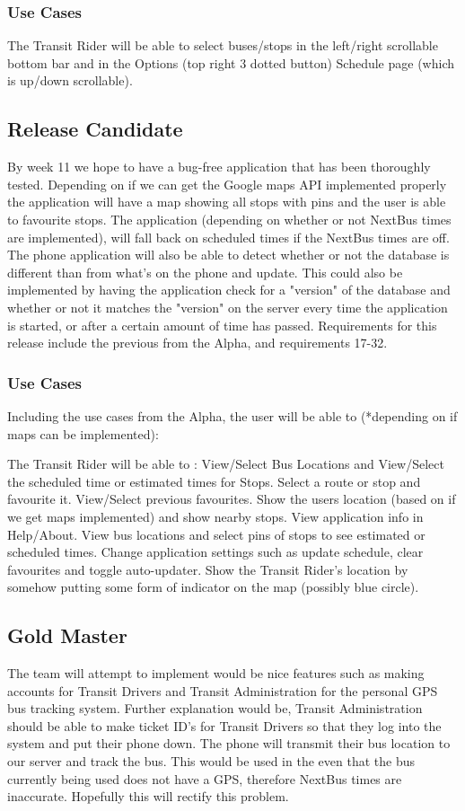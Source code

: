 \documentclass[a4paper,12pt]{article}
\begin{document}
\subsubsection{Use Cases}
The Transit Rider will be able to select buses/stops in the left/right scrollable bottom bar and in the Options (top right 3 dotted button) Schedule  page (which is up/down scrollable). 

\subsection{Release Candidate}
By week 11 we hope to have a bug-free application that has been thoroughly tested. Depending on if we can get the Google maps API implemented properly the application will have a map showing all stops with pins and the user is able to favourite stops. The application (depending on whether or not NextBus times are implemented), will fall back on scheduled times if the NextBus times are off. The phone application will also be able to detect whether or not the database is different than from what's on the phone and update. This could also be implemented by having the application check for a "version" of the database and whether or not it matches the "version" on the server every time the application is started, or after a certain amount of time has passed. Requirements for this release include the previous from the Alpha, and requirements 17-32.

\subsubsection{Use Cases}
Including the use cases from the Alpha, the user will be able to (*depending on if maps can be implemented):

The Transit Rider will be able to :
View/Select Bus Locations and View/Select the scheduled time or estimated times for Stops. Select a route or stop and favourite it. View/Select previous favourites. Show the users location (based on if we get maps implemented) and show nearby stops. View application info in Help/About.
View bus locations and select pins of stops to see estimated or scheduled times.
Change application settings such as update schedule, clear favourites and toggle auto-updater.
Show the Transit Rider's location by somehow putting some form of indicator on the map (possibly blue circle). 


\subsection{Gold Master}
The team will attempt to implement would be nice features such as making accounts for Transit Drivers and Transit Administration for the personal GPS bus tracking system. Further explanation would be, Transit Administration should be able to make ticket ID's for Transit Drivers so that they log into the system and put their phone down. The phone will transmit their bus location to our server and track the bus. This would be used in the even that the bus currently being used does not have a GPS, therefore NextBus times are inaccurate. Hopefully this will rectify this problem. 
\end{document}
